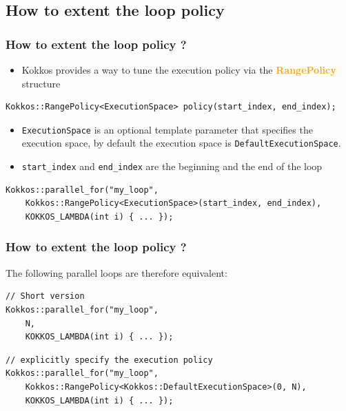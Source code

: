 \documentclass[aspectratio=169]{beamer}
\newcommand{\highlight}[1]{\textcolor{orange}{\textbf{#1}}}
\begin{document}

\subsection[Extended loop policy]{How to extent the loop policy}


\begin{frame}[fragile]
    \frametitle{How to extent the loop policy ?}

\begin{itemize}
    \item Kokkos provides a way to tune the execution policy via the \highlight{RangePolicy} structure
\end{itemize}

\small
\begin{verbatim}
Kokkos::RangePolicy<ExecutionSpace> policy(start_index, end_index);
\end{verbatim}

\begin{itemize}
    \item \texttt{ExecutionSpace} is an optional template parameter that specifies the execution space, by default the execution space is \texttt{DefaultExecutionSpace}.
    \item \texttt{start\_index} and \texttt{end\_index} are the beginning and the end of the loop
\end{itemize}

\small
\begin{verbatim}
Kokkos::parallel_for("my_loop", 
    Kokkos::RangePolicy<ExecutionSpace>(start_index, end_index),
    KOKKOS_LAMBDA(int i) { ... });
\end{verbatim}

\end{frame}


\begin{frame}[fragile]
    \frametitle{How to extent the loop policy ?}

The following parallel loops are therefore equivalent:

\small
\begin{verbatim}
// Short version
Kokkos::parallel_for("my_loop", 
    N,
    KOKKOS_LAMBDA(int i) { ... });
\end{verbatim}

\begin{verbatim}
// explicitly specify the execution policy
Kokkos::parallel_for("my_loop", 
    Kokkos::RangePolicy<Kokkos::DefaultExecutionSpace>(0, N),
    KOKKOS_LAMBDA(int i) { ... });
\end{verbatim}

\end{frame}
\end{document}
